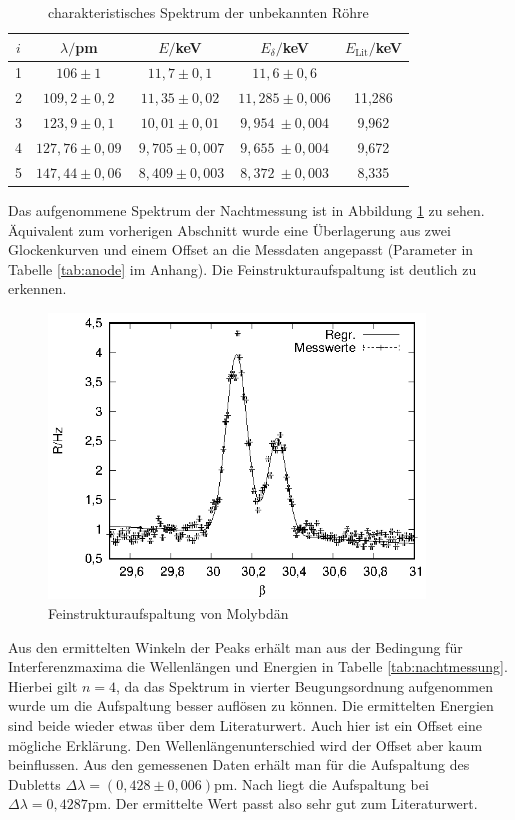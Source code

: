 \begin{table}[h]
  \centering
  \caption{charakteristisches Spektrum der unbekannten Röhre}
  \label{tab:spektrum_anode}
  \begin{tabular}{c c c c c}
    \toprule
    $i$ & $\lambda/$pm & $E/$keV & $E_\delta/$keV & $E_\mathrm{Lit}/$keV\\
    \midrule
    1   & $106 \pm 1$ & $11,7 \pm 0,1$ & $11,6 \pm 0,6$ & \\
    2   & $109,2 \pm 0,2$ & $11,35 \pm 0,02$ & $11,285 \pm 0,006$ & 11,286\\
    3   & $123,9 \pm 0,1$ & $10,01 \pm 0,01$ & $9,954 \ \pm 0,004$ & 9,962\\
    4   & $127,76 \pm 0,09$ & $\ 9,705 \pm 0,007$ & $9,655 \ \pm 0,004$ & 9,672\\
    5   & $147,44 \pm 0,06$ & $\ 8,409 \pm 0,003$ & $8,372 \ \pm 0,003$ & 8,335\\
    \bottomrule
  \end{tabular}
\end{table}

Das aufgenommene Spektrum der Nachtmessung ist in Abbildung \ref{fig:nachtmessung} zu sehen. Äquivalent zum vorherigen Abschnitt wurde eine Überlagerung aus zwei Glockenkurven und einem Offset an die Messdaten angepasst (Parameter in Tabelle \ref{tab:anode} im Anhang). Die Feinstrukturaufspaltung ist deutlich zu erkennen.

\begin{figure}[h]
  \centering
  \includegraphics[width=10cm]{data/Bragg/nachtmessung.eps}
  \caption{Feinstrukturaufspaltung von Molybdän}
  \label{fig:nachtmessung}
\end{figure}

Aus den ermittelten Winkeln der Peaks erhält man aus der Bedingung für Interferenzmaxima die Wellenlängen und Energien in Tabelle \ref{tab:nachtmessung}. Hierbei gilt $n=4$, da das Spektrum in vierter Beugungsordnung aufgenommen wurde um die Aufspaltung besser auflösen zu können. Die ermittelten Energien sind beide wieder etwas über dem Literaturwert. Auch hier ist ein Offset eine mögliche Erklärung. Den Wellenlängenunterschied wird der Offset aber kaum beinflussen. Aus den gemessenen Daten erhält man für die Aufspaltung des Dubletts $\Delta \lambda=(0,428 \pm 0,006)$pm. Nach \cite{booklet} liegt die Aufspaltung bei $\Delta \lambda= 0,4287$pm. Der ermittelte Wert passt also sehr gut zum Literaturwert.

